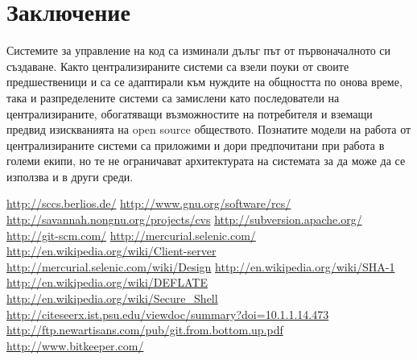 \documentclass[a4paper]{article}
\begin{document}
\section{Заключение}

  Системите за управление на код са изминали дълъг път от първоначалното си
  създаване. Както централизираните системи са взели поуки от своите
  предшественици и са се адаптирали към нуждите на общността по онова време,
  така и разпределените системи са замислени като последователи на
  централизираните, обогатяващи възможностите на потребителя и вземащи предвид
  изискванията на open source обществото. Познатите модели на работа от
  централизираните системи са приложими и дори предпочитани при работа в големи
  екипи, но те не ограничават архитектурата на системата за да може да се
  използва и в други среди.

\newpage

\begin{thebibliography}{99}
   \url{http://sccs.berlios.de/}
   \url{http://www.gnu.org/software/rcs/}
   \url{http://savannah.nongnu.org/projects/cvs}
   \url{http://subversion.apache.org/}
   \url{http://git-scm.com/}
   \url{http://mercurial.selenic.com/}
   \url{http://en.wikipedia.org/wiki/Client-server}
   \url{http://mercurial.selenic.com/wiki/Design}
   \url{http://en.wikipedia.org/wiki/SHA-1}
   \url{http://en.wikipedia.org/wiki/DEFLATE}
   \url{http://en.wikipedia.org/wiki/Secure\_Shell}
   \url{http://citeseerx.ist.psu.edu/viewdoc/summary?doi=10.1.1.14.473}
   \url{http://ftp.newartisans.com/pub/git.from.bottom.up.pdf}
   \url{http://www.bitkeeper.com/}
\end{thebibliography}
\end{document}
